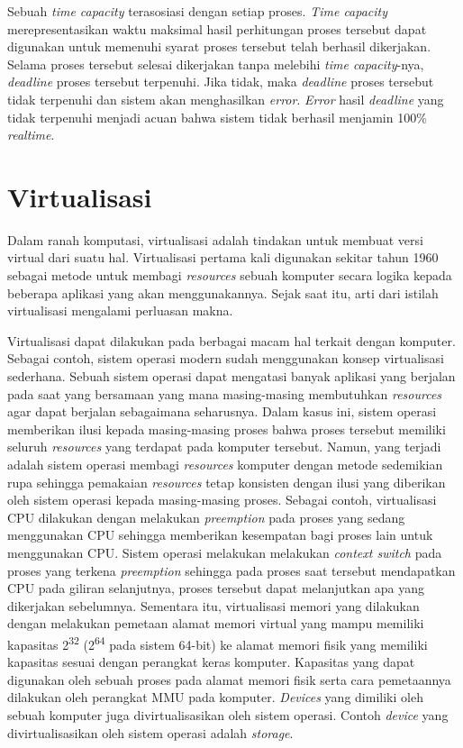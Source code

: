 Sebuah \textit{time capacity} terasosiasi dengan setiap proses.
\textit{Time capacity} merepresentasikan waktu maksimal hasil perhitungan proses tersebut dapat digunakan untuk memenuhi syarat proses tersebut telah berhasil dikerjakan.
Selama proses tersebut selesai dikerjakan tanpa melebihi \textit{time capacity}-nya, \textit{deadline} proses tersebut terpenuhi. Jika tidak, maka \textit{deadline} proses tersebut tidak terpenuhi dan sistem akan menghasilkan \textit{error}.
\textit{Error} hasil \textit{deadline} yang tidak terpenuhi menjadi acuan bahwa sistem tidak berhasil menjamin 100\% \textit{realtime}.

\section{Virtualisasi}

Dalam ranah komputasi, virtualisasi adalah tindakan untuk membuat versi virtual dari suatu hal.
Virtualisasi pertama kali digunakan sekitar tahun 1960 sebagai metode untuk membagi \textit{resources} sebuah komputer secara logika kepada beberapa aplikasi yang akan menggunakannya.
Sejak saat itu, arti dari istilah virtualisasi mengalami perluasan makna.

Virtualisasi dapat dilakukan pada berbagai macam hal terkait dengan komputer.
Sebagai contoh, sistem operasi modern sudah menggunakan konsep virtualisasi sederhana.
Sebuah sistem operasi dapat mengatasi banyak aplikasi yang berjalan pada saat yang bersamaan yang mana masing-masing membutuhkan \textit{resources} agar dapat berjalan sebagaimana seharusnya.
Dalam kasus ini, sistem operasi memberikan ilusi kepada masing-masing proses bahwa proses tersebut memiliki seluruh \textit{resources} yang terdapat pada komputer tersebut.
Namun, yang terjadi adalah sistem operasi membagi \textit{resources} komputer dengan metode sedemikian rupa sehingga pemakaian \textit{resources} tetap konsisten dengan ilusi yang diberikan oleh sistem operasi kepada masing-masing proses.
Sebagai contoh, virtualisasi CPU dilakukan dengan melakukan \textit{preemption} pada proses yang sedang menggunakan CPU sehingga memberikan kesempatan bagi proses lain untuk menggunakan CPU.
Sistem operasi melakukan melakukan \textit{context switch} pada proses yang terkena \textit{preemption} sehingga pada proses saat tersebut mendapatkan CPU pada giliran selanjutnya, proses tersebut dapat melanjutkan apa yang dikerjakan sebelumnya.
Sementara itu, virtualisasi memori yang dilakukan dengan melakukan pemetaan alamat memori virtual yang mampu memiliki kapasitas 2\textsuperscript{32} (2\textsuperscript{64} pada sistem 64-bit) ke alamat memori fisik yang memiliki kapasitas sesuai dengan perangkat keras komputer.
Kapasitas yang dapat digunakan oleh sebuah proses pada alamat memori fisik serta cara pemetaannya dilakukan oleh perangkat MMU pada komputer.
\textit{Devices} yang dimiliki oleh sebuah komputer juga divirtualisasikan oleh sistem operasi.
Contoh \textit{device} yang divirtualisasikan oleh sistem operasi adalah \textit{storage}.

